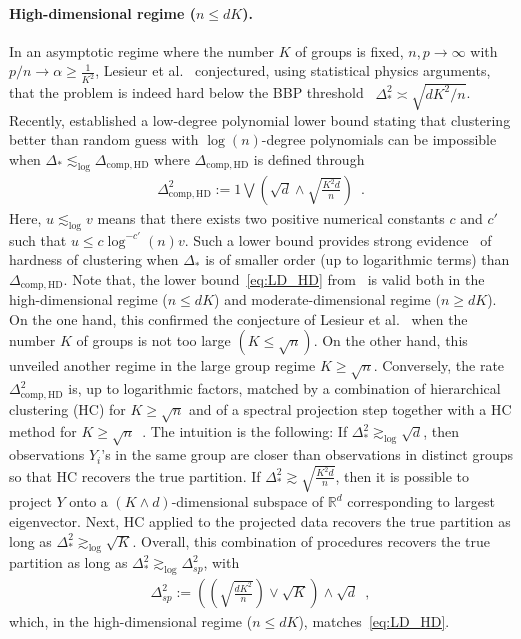 \documentclass{article}
\begin{document}
\paragraph{High-dimensional regime ($n\leq dK$).}  
In an asymptotic regime where the number $K$ of groups is fixed, $n,p\to\infty$ with $p/n\to \alpha\geq \frac{1}{K^2}$, Lesieur et al.~\cite{lesieur2016phase} conjectured, using statistical physics arguments, that the problem is indeed hard below the BBP threshold~\cite{BBP05} $\Delta_*^2\asymp \sqrt{dK^2/n}$. Recently, \cite{Even24,Even25} established a low-degree polynomial lower bound stating that clustering better than random guess with $\log(n)$-degree polynomials can be impossible when $\Delta_* \lesssim_{\log} \Delta_{\mathrm{comp,HD}}$ where $\Delta_{\mathrm{comp,HD}}$ is defined through
\begin{align}\label{eq:LD_HD}
 \Delta^2_{\mathrm{comp,HD}}:= 1\bigvee \left(\sqrt{d}\wedge \sqrt{\frac{K^2d}{n}}\right)\enspace .
\end{align}
Here, $u \lesssim_{\log} v$ means that there exists two positive numerical constants $c$ and $c'$ such that $u\leq c \log^{-c'}(n) v$.
Such a lower bound provides strong evidence~\cite{SurveyWein2025} of hardness of clustering when $\Delta_*$ is of smaller order (up to logarithmic terms) than  $ \Delta_{\mathrm{comp,HD}}$. 
Note that, the lower bound~\eqref{eq:LD_HD} from~\cite{Even25} is valid both in the  high-dimensional regime ($n\leq dK$) and moderate-dimensional regime $(n\geq dK$).
On the one hand, this confirmed the conjecture of Lesieur et al.~\cite{lesieur2016phase} when the number $K$ of groups is not too large $(K\leq \sqrt{n})$. On the other hand, this unveiled another regime in the large group regime $K\geq \sqrt{n}$. Conversely, the rate $ \Delta^2_{\mathrm{comp,HD}}$ is, up to logarithmic factors, matched by a combination of hierarchical clustering (HC) for $K\geq \sqrt{n}$ and of a spectral projection step together with a HC method for $K\geq \sqrt{n}$~\cite{Even25}. The intuition is the following: If $\Delta_*^2 \gtrsim_{\log} \sqrt{d}$, then observations $Y_i$'s in the same group are closer than observations in distinct groups so that HC recovers the true partition. If $\Delta_*^2\gtrsim \sqrt{\frac{K^2d}{n}}$, then it is  possible to project $Y$ onto a $(K\wedge d)$-dimensional subspace of $\mathbb{R}^d$ corresponding to largest eigenvector. Next,  HC applied to the projected data recovers the true partition as long as $\Delta_*^2\gtrsim_{\log} \sqrt{K}$. Overall, this combination of procedures recovers the true partition as long as $\Delta_*^2\gtrsim_{\log} \Delta^2_{sp}$, with 
\begin{align}\label{eq:UB_Sp}
\Delta^2_{sp}:= \left(\left(\sqrt{\frac{dK^2}{n}}\right) \lor  \sqrt{K}\right) \land \sqrt{d}\enspace , 
\end{align}
which, in  the high-dimensional regime ($n\leq dK$), matches~\eqref{eq:LD_HD}.
\end{document}
